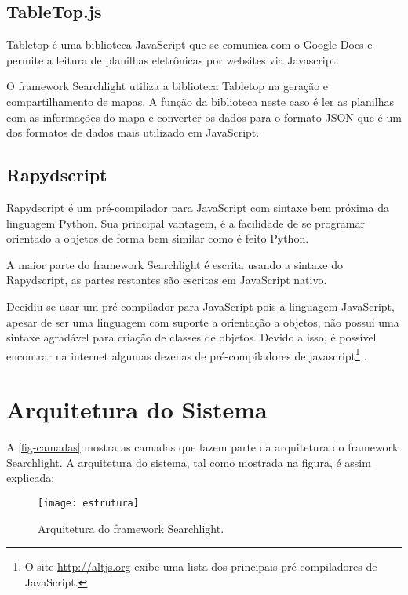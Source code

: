 \subsection{TableTop.js}

Tabletop\cite{tabletop} é uma biblioteca JavaScript que se comunica com o Google Docs e permite a leitura de planilhas eletrônicas por websites via Javascript. 

O framework Searchlight utiliza a biblioteca Tabletop na geração e compartilhamento de mapas. A função da biblioteca neste caso é ler as planilhas com as informações do mapa e converter os dados para o formato JSON que é um dos formatos de dados mais utilizado em JavaScript.


\subsection{Rapydscript}

Rapydscript \cite{rapydscript} é um pré-compilador para JavaScript com sintaxe bem próxima da linguagem Python. Sua principal vantagem, é a facilidade de se programar orientado a objetos de forma bem similar como é feito Python. 

A maior parte do framework Searchlight é escrita usando a sintaxe do Rapydscript, as partes restantes são escritas em JavaScript nativo.

Decidiu-se usar um pré-compilador para JavaScript pois a linguagem JavaScript, apesar de ser uma linguagem com suporte a orientação a objetos, não possui uma sintaxe agradável para criação de classes de objetos. Devido a isso, é possível encontrar na internet algumas dezenas de pré-compiladores de javascript\footnote{O site \url{http://altjs.org} exibe uma lista dos principais pré-compiladores de JavaScript.}
. 


\section{Arquitetura do Sistema}
A \autoref{fig-camadas} mostra as camadas que fazem parte da arquitetura do framework Searchlight. A arquitetura do sistema, tal como mostrada na figura, é assim explicada:
	\begin{figure}[htb]
	\caption{\label{fig-camadas}Arquitetura do framework Searchlight.}
	\begin{center}
	    \texttt{[image: estrutura]}
	\end{center}
\end{figure}

